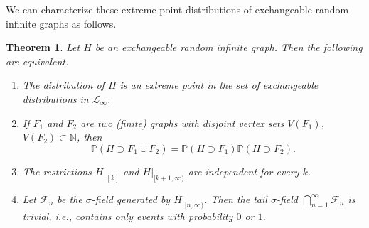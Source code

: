 \documentclass[11pt,reqno,tbtags]{amsart}
\numberwithin{equation}{section}
\newtheorem{theorem}{Theorem}[section]
\theoremstyle{definition}
\theoremstyle{remark}
\newenvironment{romenumerate}{\begin{enumerate}%
 \renewcommand{\labelenumi}{\textup{(\roman{enumi})}}%
 \renewcommand{\theenumi}{\textup{(\roman{enumi})}}%
 }{\end{enumerate}}
\newcommand\ie{i.e.\spacefactor=1000}
\newcommand\bbN{\mathbb N}
\renewcommand\P{\operatorname{\mathbb P{}}}
\newcommand\gs{\sigma}
\newcommand\cF{\mathcal F}
\newcommand\cL{{\mathcal L}}
\renewcommand{\=}{:=}
\newcommand{\cloo}{\cL_\infty}
\newcommand{\rest}[1]{|_{[#1]}}
\newcommand{\restx}[1]{|_{#1}}
\newcommand{\exch}{exchangeable}
\begin{document}
We can characterize these extreme point distributions of \exch{}
random infinite graphs as follows.

\begin{theorem}
  \label{TE2}
Let $H$ be an \exch{} random infinite graph.
Then the following are equivalent.
\begin{romenumerate}
  \item\label{te2a}
The distribution of $H$ is an extreme point in the set of \exch{}
distributions in $\cloo$.
  \item\label{te2b'}
If $F_1$ and $F_2$ are two (finite) graphs with disjoint vertex sets
$V(F_1)$, $V(F_2)\subset\bbN$, then
\begin{equation*}
  \P(H\supset F_1\cup F_2)=\P(H\supset F_1)\P(H\supset F_2).
\end{equation*}
  \item\label{te2b}
The restrictions $H\rest k$ and $H\restx{[k+1,\infty)}$ are
  independent for every $k$.
  \item\label{te2c}
Let $\cF_n$ be the $\gs$-field generated by
$H\restx{[n,\infty)}$. Then the tail $\gs$-field
  $\bigcap_{n=1}^\infty \cF_n$ is trivial, \ie, contains only events with
  probability $0$ or $1$.
\end{romenumerate}
\end{theorem}
\end{document}
